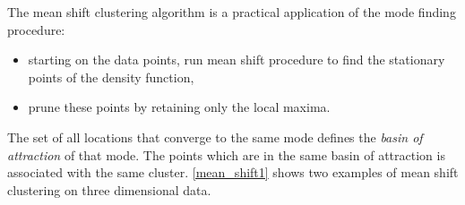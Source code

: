 The mean shift clustering algorithm is a practical application of the mode
finding procedure:
\begin{itemize}
	\item starting on the data points, run mean shift procedure to find the 
	stationary points of the density function,
	\item prune these points by retaining only the local maxima.
\end{itemize}

The set of all locations that converge to the same mode defines the \emph{basin of attraction} of that mode. The points which are in the same basin of 
attraction is associated with the same cluster. \autoref{mean_shift1} shows two examples of mean shift clustering on three dimensional data.


